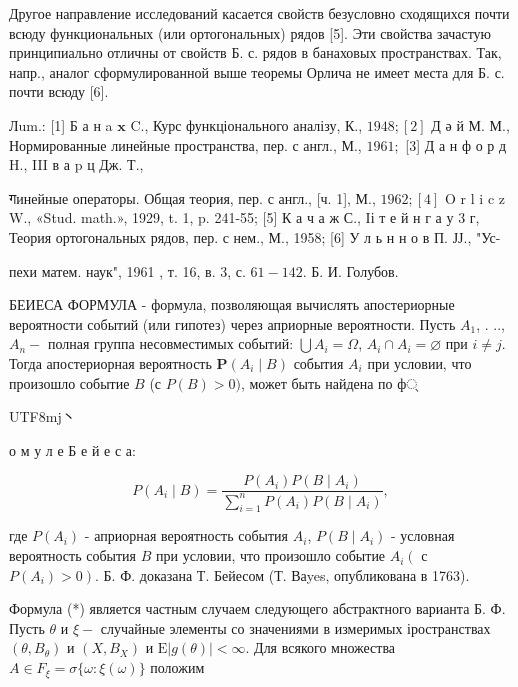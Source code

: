 \documentclass[10pt]{article}
\begin{document}
Другое направление исследований касается свойств безусловно сходящихся почти всюду функциональных (или ортогональных) рядов [5]. Эти свойства зачастую принципиально отличны от свойств Б. с. рядов в банаховых пространствах. Так, напр., аналог сформулированной выше теоремы Орлича не имеет места для Б. с. почти всюду [6].



Лum.: [1] Б а н a $\mathbf{x}$ C., Курс функціонального аналізу, К., $1948 ;[2]$ Д ә й М. М., Нормированные линейные пространства, пер. с англ., М., $1961 ;$ [3] Д а н ф о р д H., III в а p ц Дж. Т.,

गинейные операторы. Общая теория, пер. с англ., [ч. 1], М., $1962 ;[4]$ O r l i c z W., «Stud. math.», 1929, t. 1, p. 241-55; [5] К а ч а ж С., Iі т е й н $г$ а у 3 г, Теория ортогональных рядов, пер. с нем., М., 1958; [6] У л ь н н о в П. ЈЈ., "Ус-

пехи матем. наук", 1961 , т. 16, в. 3, с. $61-142$. Б. И. Голубов.



БЕИЕСА ФОРМУЛА - формула, позволяющая вычислять апостериорные вероятности событий (или гипотез) через априорные вероятности. Пусть $A_{1}$, . .., $A_{n}-$ полная группа несовместимых событий: $\bigcup A_{i}=\Omega$, $A_{i} \cap A_{i}=\varnothing$ при $i \neq j$. Тогда апостериорная вероятность $\boldsymbol{P}\left(A_{i} \mid B\right)$ события $A_{i}$ при условии, что произошло событие $B$ (с $P(B)>0)$, может быть найдена по ф्\begin{CJK}{UTF8}{mj}丶\end{CJK} о м у л е Б е й е с а:



\[

P\left(A_{i} \mid B\right)=\frac{P\left(A_{i}\right) P\left(B \mid A_{i}\right)}{\sum_{i=1}^{n} P\left(A_{i}\right) P\left(B \mid A_{i}\right)},

\]



где $P\left(A_{i}\right)$ - априорная вероятность события $A_{i}$, $P\left(B \mid A_{i}\right)$ - условная вероятность события $B$ при условии, что произошло событие $A_{i}\left(\right.$ с $\left.P\left(A_{i}\right)>0\right)$. Б. Ф. доказана Т. Бейесом (Т. Ваyes, опубликована в 1763).



Формула (*) является частным случаем следующего абстрактного варианта Б. Ф. Пусть $\theta$ и $\xi-$ случайные элементы со значениями в измеримых іространствах $\left(\theta, B_{\theta}\right)$ и $\left(X, B_{X}\right)$ и $\mathrm{E}|g(\theta)|<\infty$. Для всякого множества $A \in F_{\xi}=\sigma\{\omega: \xi(\omega)\}$ положим
\end{document}
